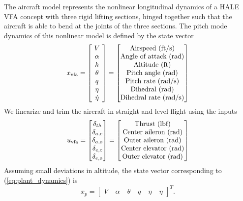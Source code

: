 The aircraft model represents the nonlinear longitudinal dynamics of a HALE VFA concept with three rigid lifting sections, hinged together such that the aircraft is able to bend at the joints of the three sections. The pitch mode dynamics of this nonlinear model is defined by the state vector
\begin{equation}
x_{\text{vfa}} = \begin{bmatrix}
~V~\\
\alpha \\
h \\
\theta \\
q\\
\eta\\
\dot{\eta}
\end{bmatrix} =
\begin{bmatrix}
	 $Airspeed (ft/s)$\\ $Angle of attack (rad)$\\ $Altitude (ft)$\\ $Pitch angle (rad)$\\ $Pitch rate (rad/s)$\\ $Dihedral (rad)$\\ $Dihedral rate (rad/s)$
\end{bmatrix}
\end{equation}
We linearize and trim the aircraft in straight and level flight using the inputs
\begin{equation}
	u_{\text{vfa}} = \begin{bmatrix}
\delta_{th} \\
\delta_{a,c} \\
\delta_{a,o} \\
\delta_{e,c} \\
\delta_{e,o} 
\end{bmatrix} = \begin{bmatrix}
		$Thrust (lbf)$\\
		$Center aileron (rad)$\\
		$Outer aileron (rad)$\\
		$Center elevator (rad)$\\
		$Outer elevator (rad)$
	\end{bmatrix}
\end{equation}
Assuming small deviations in altitude, the state vector corresponding to (\ref{eq:plant_dynamics}) is
\begin{equation}
	x_p = \begin{bmatrix}
V & \; \alpha & \; \theta & \; q & \; \eta & \; \dot{\eta}
\end{bmatrix}^T.
\end{equation}

